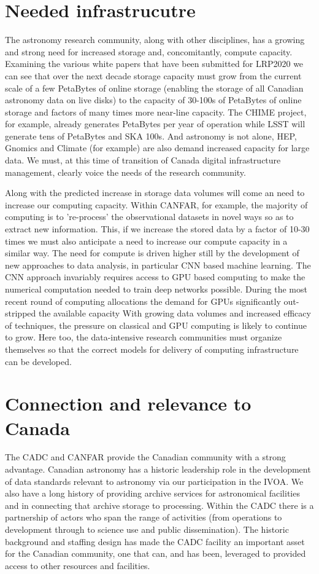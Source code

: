 \documentclass[11pt]{article}
\begin{document}
\section{Needed infrastrucutre}
The astronomy research community, along with other disciplines,  has a growing and strong need for increased storage and, concomitantly, compute capacity.
Examining the various white papers that have been submitted for LRP2020 we can see that over the next decade storage capacity must grow from the current scale of a few PetaBytes of online storage (enabling the storage of all Canadian astronomy data on live disks) to the capacity of 30-100s of PetaBytes of online storage and factors of many times more near-line capacity.  The CHIME project, for example, already generates PetaBytes per year of operation while LSST will generate tens of PetaBytes and SKA 100s.  
And astronomy is not alone, HEP, Gnomics and Climate (for example) are also demand increased capacity for large data.  We must, at this time of transition of Canada digital infrastructure management, clearly voice the needs of the research community.

Along with the predicted increase in storage data volumes will come an need to increase our computing capacity.  Within CANFAR, for example, the majority of computing is to 're-process' the observational datasets in novel ways so as to extract new information.  This, if we increase the stored data by a factor of 10-30 times we must also anticipate a need to increase our compute capacity in a similar way.  The need for compute is driven higher still by the development of new approaches to data analysis, in particular CNN based machine learning.  The CNN approach invariably requires access to GPU based computing to make the numerical computation needed to train deep networks possible. During the most recent round of computing allocations the demand for GPUs significantly out-stripped the available capacity  With growing data volumes and increased efficacy of techniques, the pressure on classical and GPU computing is likely to continue to grow.  Here too, the data-intensive research communities must organize themselves so that the correct models for delivery of computing infrastructure can be developed.


\section{Connection and relevance to Canada}
The CADC and CANFAR  provide the Canadian community with a strong advantage.
Canadian astronomy has a historic leadership role in the development of data standards relevant to astronomy via our participation in the IVOA.  We also have a long history of providing archive services for astronomical facilities and in connecting that archive storage to processing.  Within the CADC there is a partnership of actors who span the range of activities (from operations to development through to science use and public dissemination).  The historic background and staffing design has made the CADC facility an important asset for the Canadian community, one that can, and has been, leveraged to provided access to other resources and facilities. 
\end{document}
